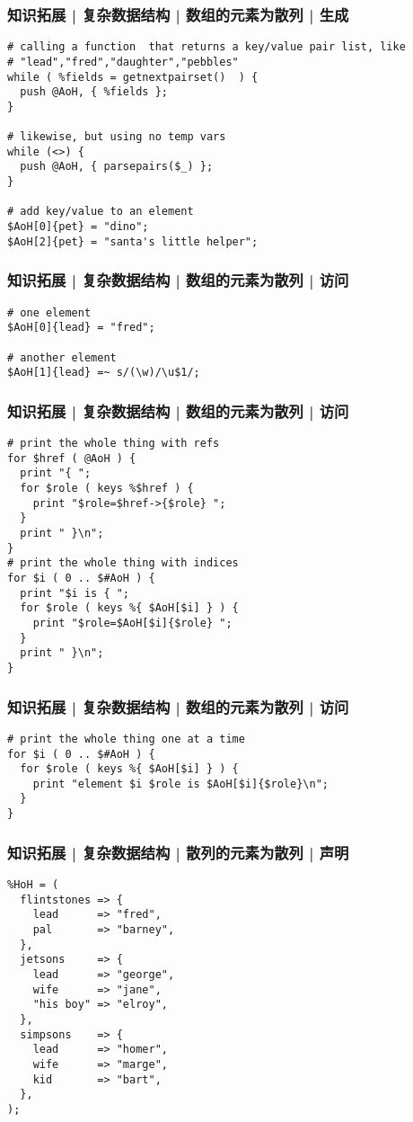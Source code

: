 \begin{frame}[fragile]
  \frametitle{知识拓展 | 复杂数据结构 | 数组的元素为散列 | 生成}
\begin{lstlisting}
# calling a function  that returns a key/value pair list, like
# "lead","fred","daughter","pebbles"
while ( %fields = getnextpairset()  ) {
  push @AoH, { %fields };
}

# likewise, but using no temp vars
while (<>) {
  push @AoH, { parsepairs($_) };
}

# add key/value to an element
$AoH[0]{pet} = "dino";
$AoH[2]{pet} = "santa's little helper";
\end{lstlisting}
\end{frame}

\begin{frame}[fragile]
  \frametitle{知识拓展 | 复杂数据结构 | 数组的元素为散列 | 访问}
\begin{lstlisting}
# one element
$AoH[0]{lead} = "fred";

# another element
$AoH[1]{lead} =~ s/(\w)/\u$1/;
\end{lstlisting}
\end{frame}

\begin{frame}[fragile]
  \frametitle{知识拓展 | 复杂数据结构 | 数组的元素为散列 | 访问}
\begin{lstlisting}
# print the whole thing with refs
for $href ( @AoH ) {
  print "{ ";
  for $role ( keys %$href ) {
    print "$role=$href->{$role} ";
  }
  print " }\n";
}
# print the whole thing with indices
for $i ( 0 .. $#AoH ) {
  print "$i is { ";
  for $role ( keys %{ $AoH[$i] } ) {
    print "$role=$AoH[$i]{$role} ";
  }
  print " }\n";
}
\end{lstlisting}
\end{frame}

\begin{frame}[fragile]
  \frametitle{知识拓展 | 复杂数据结构 | 数组的元素为散列 | 访问}
\begin{lstlisting}
# print the whole thing one at a time
for $i ( 0 .. $#AoH ) {
  for $role ( keys %{ $AoH[$i] } ) {
    print "element $i $role is $AoH[$i]{$role}\n";
  }
}
\end{lstlisting}
\end{frame}

\begin{frame}[fragile]
  \frametitle{知识拓展 | 复杂数据结构 | 散列的元素为散列 | 声明}
\begin{lstlisting}
%HoH = (
  flintstones => {
    lead      => "fred",
    pal       => "barney",
  },
  jetsons     => {
    lead      => "george",
    wife      => "jane",
    "his boy" => "elroy",
  },
  simpsons    => {
    lead      => "homer",
    wife      => "marge",
    kid       => "bart",
  },
);
\end{lstlisting}
\end{frame}

